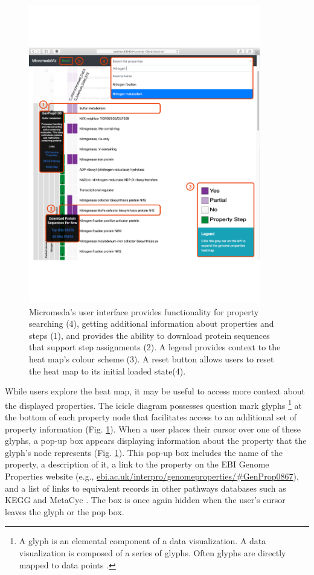 \begin{figure}[!ht]
  \centering
	\includegraphics[width=0.9\textwidth]{media/micromeda-interface.pdf}
	 \caption{Micromeda's user interface provides functionality for property searching (4), getting additional information about properties and steps (1), and provides the ability to download protein sequences that support step assignments (2). A legend provides context to the heat map's colour scheme (3). A reset button allows users to reset the heat map to its initial loaded state(4).}
	 \label{fig:micromeda-interface}
\end{figure}

While users explore the heat map, it may be useful to access more context about the displayed properties. The icicle diagram possesses question mark glyphs \footnote{A glyph is an elemental component of a data visualization. A data visualization is composed of a series of glyphs. Often glyphs are directly mapped to data points \cite{chen}.} at the bottom of each property node that facilitates access to an additional set of property information (Fig. \ref{fig:micromeda-interface}). When a user places their cursor over one of these glyphs, a pop-up box appears displaying information about the property that the glyph's node represents (Fig. \ref{fig:micromeda-interface}). This pop-up box includes the name of the property, a description of it, a link to the property on the EBI Genome Properties website (e.g., \href{ebi.ac.uk/interpro/genomeproperties/\#GenProp0867}{ebi.ac.uk/interpro/genomeproperties/\#GenProp0867}), and a list of links to equivalent records in other pathways databases such as KEGG \cite{kanehisa2000kegg} and MetaCyc \cite{karp2002metacyc}. The box is once again hidden when the user's cursor leaves the glyph or the pop box.

